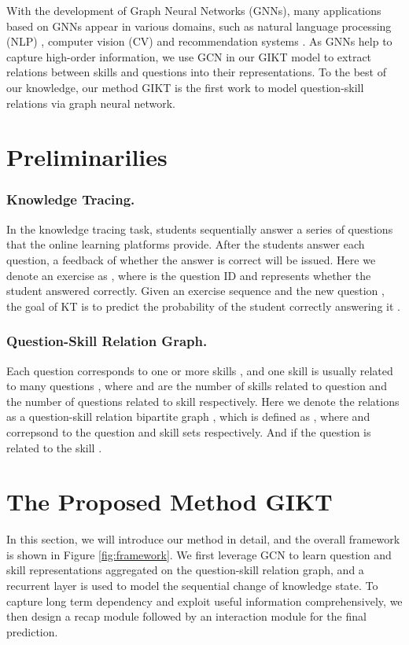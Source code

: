 \documentclass[runningheads]{llncs}
\begin{document}
With the development of Graph Neural Networks (GNNs), many applications based on GNNs appear in various domains, such as natural language processing (NLP) \cite{beck2018graph,yao2019graph}, computer vision (CV) \cite{qi20173d,garcia2017few} and recommendation systems \cite{wang2019kgat,qu2019end}. As GNNs help to capture high-order information, we use GCN in our GIKT model to extract relations between skills and questions into their representations. To the best of our knowledge, our method GIKT is the first work to model question-skill relations via graph neural network.

\section{Preliminarilies}
\subsubsection{Knowledge Tracing.} In the knowledge tracing task, students sequentially answer a series of questions that the online learning platforms provide. After the students answer each question, 
a feedback of whether the answer is correct will be issued. Here we denote an exercise as , where  is the question ID and  represents whether the student answered  correctly. Given an exercise sequence  and the new question , the goal of KT is to predict the probability of the student correctly answering it .
\subsubsection{Question-Skill Relation Graph.} Each question  corresponds to one or more skills , and one skill  is usually related to many questions , where  and  	are the number of skills related to question  and the number of questions related to skill  respectively. Here we denote the relations as a question-skill relation bipartite graph , which is defined as , where  and  correpsond to the question and skill sets respectively. 
And  if the question  is related to the skill . 

\section{The Proposed Method GIKT}
In this section, we will introduce our method in detail, and the overall framework is shown in Figure \ref{fig:framework}. We first leverage GCN to learn question and skill representations aggregated on the question-skill relation graph, and a recurrent layer is used to model the sequential change of knowledge state. To capture long term dependency and exploit useful information comprehensively, we then design a recap module followed by an interaction module for the final prediction. 
\end{document}
